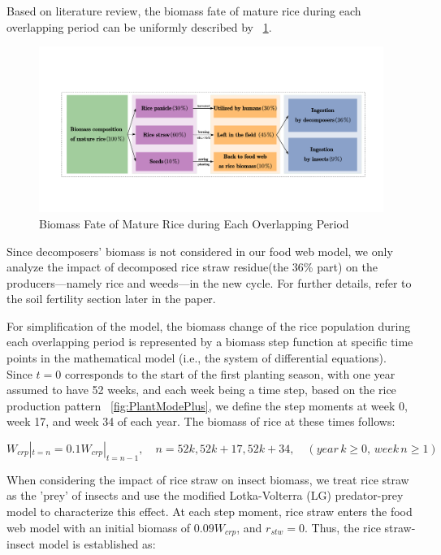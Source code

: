 \documentclass{HZNUMCM}
\begin{document}
        Based on literature review\cite{OLIVER20191139,summers2003biomass}, 
        the biomass fate of mature rice during each overlapping period can be uniformly described by \figurename~\ref{fig:rice_to}. 
        \begin{figure}[H]
          \centering
          \includegraphics[width=\linewidth]{images/rice_to.pdf}
          \caption{Biomass Fate of Mature Rice during Each Overlapping Period}
          \label{fig:rice_to}
        \end{figure}
        Since decomposers' biomass is not considered in our food web model, 
        we only analyze the impact of decomposed rice straw residue(the 36\% part) on the producers—namely rice and weeds—in the new cycle. 
        For further details, refer to the soil fertility section later in the paper.
      
        For simplification of the model, 
        the biomass change of the rice population during each overlapping period is represented 
        by a biomass step function at specific time points in the mathematical model (i.e., the system of differential equations). 
        Since $t=0$ corresponds to the start of the first planting season, with one year assumed to have 52 weeks, 
        and each week being a time step, based on the rice production pattern \figurename~\ref{fig:PlantModePlus}, 
        we define the step moments at week 0, week 17, and week 34 of each year. The biomass of rice at these times follows:

        \begin{equation}
        W_{crp}|_{t=n}=0.1W_{crp}|_{t=n-1}, \quad n = 52k, 52k+17, 52k+34, \quad (year\, k \geqslant 0, \, week\, n \geqslant 1)
        \end{equation}

        When considering the impact of rice straw on insect biomass, 
        we treat rice straw as the 'prey' of insects and use the modified Lotka-Volterra (LG) predator-prey model to characterize this effect. 
        At each step moment, rice straw enters the food web model with an initial biomass of $0.09W_{crp}$, and $r_{stw} = 0$. 
        Thus, the rice straw-insect model is established as:
\end{document}
